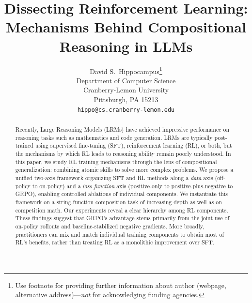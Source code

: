 \documentclass{article}
\title{Dissecting Reinforcement Learning: Mechanisms Behind Compositional Reasoning in LLMs}
\author{%
  David S.~Hippocampus\thanks{Use footnote for providing further information
    about author (webpage, alternative address)---\emph{not} for acknowledging
    funding agencies.} \\
  Department of Computer Science\\
  Cranberry-Lemon University\\
  Pittsburgh, PA 15213 \\
  \texttt{hippo@cs.cranberry-lemon.edu} \\
}
\newcommand{\el}[1]{\textcolor{purple}{EL: #1}}
\begin{document}
\maketitle


\begin{abstract}
Recently, Large Reasoning Models (LRMs) have achieved impressive performance on reasoning tasks such as mathematics and code generation. LRMs are typically post-trained using supervised fine-tuning (SFT), reinforcement learning (RL), or both, but the mechanisms by which RL leads to reasoning ability remain poorly understood. In this paper, we study RL training mechanisms through the lens of compositional generalization: combining atomic skills to solve more complex problems.
We propose a unified two-axis framework organizing SFT and RL methods along a \emph{data} axis (off-policy to on-policy) and a \emph{loss function} axis (positive-only to positive-plus-negative to GRPO), enabling controlled ablations of individual components. We instantiate this framework on a string-function composition task of increasing depth as well as on competition math.
Our experiments reveal a clear hierarchy among RL components. 
These findings suggest that GRPO's advantage stems primarily from the joint use of on-policy rollouts and baseline-stabilized negative gradients. More broadly, practitioners can mix and match individual training components to obtain most of RL's benefits, rather than treating RL as a monolithic improvement over SFT.
\end{abstract}
\end{document}
